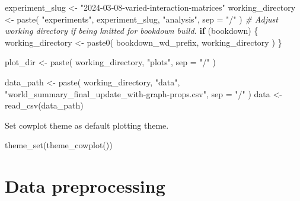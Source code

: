 \documentclass[
]{book}
\newenvironment{Shaded}{\begin{snugshade}}{\end{snugshade}}
\newcommand{\AttributeTok}[1]{\textcolor[rgb]{0.77,0.63,0.00}{#1}}
\newcommand{\CommentTok}[1]{\textcolor[rgb]{0.56,0.35,0.01}{\textit{#1}}}
\newcommand{\ControlFlowTok}[1]{\textcolor[rgb]{0.13,0.29,0.53}{\textbf{#1}}}
\newcommand{\FunctionTok}[1]{\textcolor[rgb]{0.00,0.00,0.00}{#1}}
\newcommand{\NormalTok}[1]{#1}
\newcommand{\OtherTok}[1]{\textcolor[rgb]{0.56,0.35,0.01}{#1}}
\newcommand{\StringTok}[1]{\textcolor[rgb]{0.31,0.60,0.02}{#1}}
\begin{document}
\begin{Shaded}
\begin{Highlighting}[]
\NormalTok{experiment\_slug }\OtherTok{\textless{}{-}} \StringTok{"2024{-}03{-}08{-}varied{-}interaction{-}matrices"}
\NormalTok{working\_directory }\OtherTok{\textless{}{-}} \FunctionTok{paste}\NormalTok{(}
  \StringTok{"experiments"}\NormalTok{,}
\NormalTok{  experiment\_slug,}
  \StringTok{"analysis"}\NormalTok{,}
  \AttributeTok{sep =} \StringTok{"/"}
\NormalTok{)}
\CommentTok{\# Adjust working directory if being knitted for bookdown build.}
\ControlFlowTok{if}\NormalTok{ (bookdown) \{}
\NormalTok{  working\_directory }\OtherTok{\textless{}{-}} \FunctionTok{paste0}\NormalTok{(}
\NormalTok{    bookdown\_wd\_prefix,}
\NormalTok{    working\_directory}
\NormalTok{  )}
\NormalTok{\}}

\NormalTok{plot\_dir }\OtherTok{\textless{}{-}} \FunctionTok{paste}\NormalTok{(}
\NormalTok{  working\_directory,}
  \StringTok{"plots"}\NormalTok{,}
  \AttributeTok{sep =} \StringTok{"/"}
\NormalTok{)}

\NormalTok{data\_path }\OtherTok{\textless{}{-}} \FunctionTok{paste}\NormalTok{(}
\NormalTok{  working\_directory,}
  \StringTok{"data"}\NormalTok{,}
  \StringTok{"world\_summary\_final\_update\_with{-}graph{-}props.csv"}\NormalTok{,}
  \AttributeTok{sep =} \StringTok{"/"}
\NormalTok{)}
\NormalTok{data }\OtherTok{\textless{}{-}} \FunctionTok{read\_csv}\NormalTok{(data\_path)}
\end{Highlighting}
\end{Shaded}

Set cowplot theme as default plotting theme.

\begin{Shaded}
\begin{Highlighting}[]
\FunctionTok{theme\_set}\NormalTok{(}\FunctionTok{theme\_cowplot}\NormalTok{())}
\end{Highlighting}
\end{Shaded}

\hypertarget{data-preprocessing-1}{%
\section{Data preprocessing}\label{data-preprocessing-1}}
\end{document}
